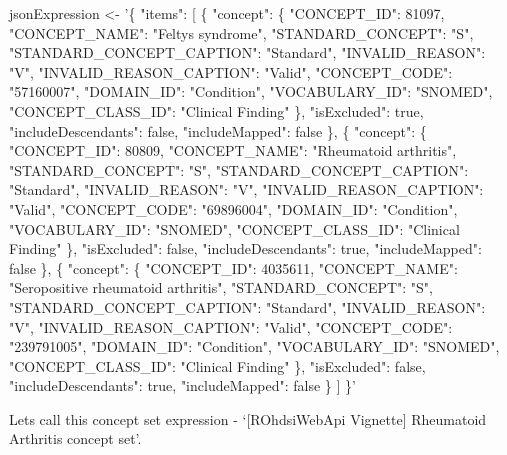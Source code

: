\documentclass[
]{article}
\newenvironment{Shaded}{\begin{snugshade}}{\end{snugshade}}
\newcommand{\NormalTok}[1]{#1}
\newcommand{\StringTok}[1]{\textcolor[rgb]{0.31,0.60,0.02}{#1}}
\begin{document}
\begin{Shaded}
\begin{Highlighting}[]

\NormalTok{jsonExpression <-}\StringTok{ '\{}
\StringTok{  "items": [}
\StringTok{    \{}
\StringTok{      "concept": \{}
\StringTok{        "CONCEPT_ID": 81097,}
\StringTok{        "CONCEPT_NAME": "Feltys syndrome",}
\StringTok{        "STANDARD_CONCEPT": "S",}
\StringTok{        "STANDARD_CONCEPT_CAPTION": "Standard",}
\StringTok{        "INVALID_REASON": "V",}
\StringTok{        "INVALID_REASON_CAPTION": "Valid",}
\StringTok{        "CONCEPT_CODE": "57160007",}
\StringTok{        "DOMAIN_ID": "Condition",}
\StringTok{        "VOCABULARY_ID": "SNOMED",}
\StringTok{        "CONCEPT_CLASS_ID": "Clinical Finding"}
\StringTok{      \},}
\StringTok{      "isExcluded": true,}
\StringTok{      "includeDescendants": false,}
\StringTok{      "includeMapped": false}
\StringTok{    \},}
\StringTok{    \{}
\StringTok{      "concept": \{}
\StringTok{        "CONCEPT_ID": 80809,}
\StringTok{        "CONCEPT_NAME": "Rheumatoid arthritis",}
\StringTok{        "STANDARD_CONCEPT": "S",}
\StringTok{        "STANDARD_CONCEPT_CAPTION": "Standard",}
\StringTok{        "INVALID_REASON": "V",}
\StringTok{        "INVALID_REASON_CAPTION": "Valid",}
\StringTok{        "CONCEPT_CODE": "69896004",}
\StringTok{        "DOMAIN_ID": "Condition",}
\StringTok{        "VOCABULARY_ID": "SNOMED",}
\StringTok{        "CONCEPT_CLASS_ID": "Clinical Finding"}
\StringTok{      \},}
\StringTok{      "isExcluded": false,}
\StringTok{      "includeDescendants": true,}
\StringTok{      "includeMapped": false}
\StringTok{    \},}
\StringTok{    \{}
\StringTok{      "concept": \{}
\StringTok{        "CONCEPT_ID": 4035611,}
\StringTok{        "CONCEPT_NAME": "Seropositive rheumatoid arthritis",}
\StringTok{        "STANDARD_CONCEPT": "S",}
\StringTok{        "STANDARD_CONCEPT_CAPTION": "Standard",}
\StringTok{        "INVALID_REASON": "V",}
\StringTok{        "INVALID_REASON_CAPTION": "Valid",}
\StringTok{        "CONCEPT_CODE": "239791005",}
\StringTok{        "DOMAIN_ID": "Condition",}
\StringTok{        "VOCABULARY_ID": "SNOMED",}
\StringTok{        "CONCEPT_CLASS_ID": "Clinical Finding"}
\StringTok{      \},}
\StringTok{      "isExcluded": false,}
\StringTok{      "includeDescendants": true,}
\StringTok{      "includeMapped": false}
\StringTok{    \}}
\StringTok{  ]}
\StringTok{\}'}
\end{Highlighting}
\end{Shaded}

Lets call this concept set expression - `{[}ROhdsiWebApi Vignette{]}
Rheumatoid Arthritis concept set'.
\end{document}
